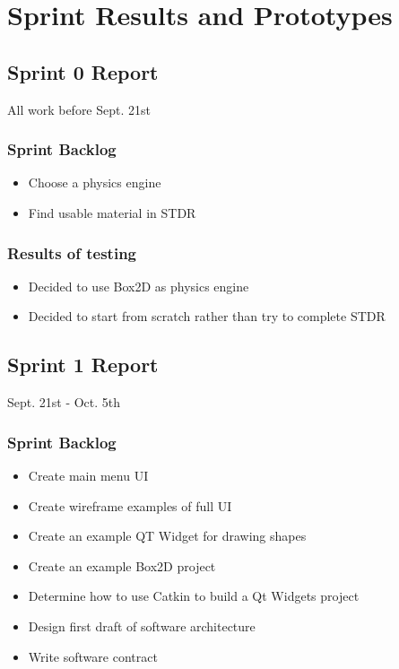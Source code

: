 

\chapter{Sprint Results and Prototypes}

\section{Sprint 0 Report}
All work before Sept. 21st
\subsection{Sprint Backlog}
\begin{itemize}
	\item Choose a physics engine
	\item Find usable material in STDR
\end{itemize}
\subsection{Results of testing}
\begin{itemize}
	\item Decided to use Box2D as physics engine
	\item Decided to start from scratch rather than try to complete STDR
\end{itemize}


\section{Sprint 1 Report}
Sept. 21st - Oct. 5th
\subsection{Sprint Backlog}
\begin{itemize}
	\item Create main menu UI
	\item Create wireframe examples of full UI
	\item Create an example QT Widget for drawing shapes
	\item Create an example Box2D project
	\item Determine how to use Catkin to build a Qt Widgets project
	\item Design first draft of software architecture
	\item Write software contract
\end{itemize}
